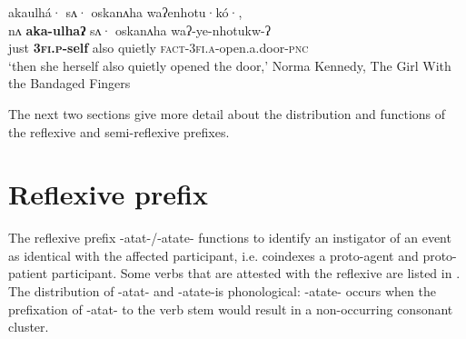 \documentclass[output=paper]{langscibook}
\begin{document}
{}
    \label{ex:oneida:12}
    {akaulhá·}    {sʌ·} {oskanʌha}  {waʔenhotu·kó·,}\\
     nʌ \textbf{aka-ulhaʔ} sʌ· oskanʌha waʔ-ye-nhotukw-ʔ  \\  
    just  \textbf{\textsc{3fi.p}}\textbf{-self}  also  quietly \textsc{fact-3fi.a}-open.a.door-\textsc{pnc}\\
    \glt ‘then she herself also quietly opened the door,’ Norma Kennedy, {The} {Girl} {With} {the} {Bandaged} {Fingers}
  \z

The next two sections give more detail about the distribution and functions of the reflexive and semi-reflexive prefixes.

\section{Reflexive prefix}\label{sec:oneida:3}

The reflexive prefix {-atat-/-atate-} functions to identify an instigator of an event as identical with the affected participant, i.e. coindexes a proto-agent and proto-patient participant. Some verbs that are attested with the reflexive are listed in . The distribution of {{}-atat-} and {{}-atate-}is phonological: {{}-atate-} occurs when the prefixation of {{}-atat-} to the verb stem would result in a non-occur\-ring consonant cluster.
\end{document}
